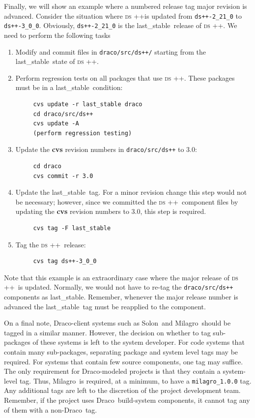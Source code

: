 \documentclass[11pt]{nmemo}
\newcommand{\draco}{{\normalfont\normalsize\sffamily Draco}}
\newcommand{\milagro}{{\normalfont\normalsize\sffamily Milagro}}
\newcommand{\solon}{{\normalfont\normalsize\sffamily Solon}}
\newcommand{\dsxx}{{\normalfont\normalsize\scshape ds\raisebox{.2ex}
  {\scriptsize ++}}}
\newcommand{\stable}{{\normalfont\normalsize\ttfamily last\_stable}}
\begin{document}
Finally, we will show an example where a numbered release tag major
revision is advanced.  Consider the situation where \dsxx is updated
from \texttt{ds++-2\_21\_0} to \texttt{ds++-3\_0\_0}.  Obviously,
\texttt{ds++-2\_21\_0} is the \stable\ release of \dsxx.  We need to
perform the following tasks
\begin{enumerate}
\item Modify and commit files in \texttt{draco/src/ds++/} starting
  from the \stable\ state of \dsxx.
\item Perform regression tests on all packages that use \dsxx.  These
  packages must be in a \stable\ condition:
\begin{verbatim}
     cvs update -r last_stable draco
     cd draco/src/ds++
     cvs update -A
     (perform regression testing)
\end{verbatim}
\item Update the {\bf cvs} revision numbers in \texttt{draco/src/ds++} 
  to 3.0:
\begin{verbatim}
     cd draco
     cvs commit -r 3.0
\end{verbatim}
\item Update the \stable\ tag.  For a minor revision change this step
  would not be necessary; however, since we committed the \dsxx\
  component files by updating the {\bf cvs} revision numbers to 3.0,
  this step is required.
\begin{verbatim}
     cvs tag -F last_stable
\end{verbatim}
\item Tag the \dsxx\ release:
\begin{verbatim}
     cvs tag ds++-3_0_0
\end{verbatim}
\end{enumerate}
Note that this example is an extraordinary case where the major
release of \dsxx\ is updated.  Normally, we would not have to re-tag
the \texttt{draco/src/ds++} components as \stable.  Remember, whenever
the major release number is advanced the \stable\ tag must be
reapplied to the component.

On a final note, \draco-client systems such as \solon\ and \milagro\ 
should be tagged in a similar manner.  However, the decision on
whether to tag sub-packages of these systems is left to the system
developer.  For code systems that contain many sub-packages,
separating package and system level tags may be required.  For systems
that contain few source components, one tag may suffice.  The only
requirement for \draco-modeled projects is that they contain a
system-level tag.  Thus, \milagro\ is required, at a minimum, to have
a \texttt{milagro\_1.0.0} tag.  Any additional tags are left to the
discretion of the project development team.  Remember, if the project
uses \draco\ build-system components, it cannot tag any of them with a
non-\draco\ tag.
\end{document}
